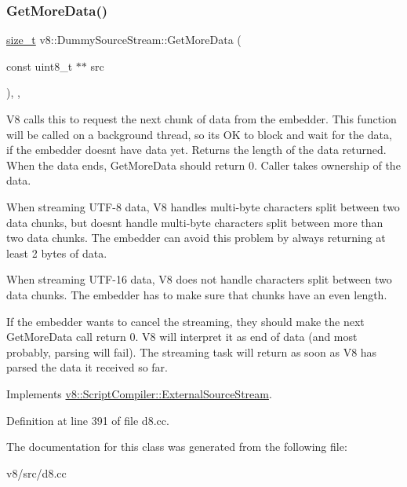 \subsubsection{\texorpdfstring{Get\+More\+Data()}{GetMoreData()}}
{\footnotesize\ttfamily \mbox{\hyperlink{classsize__t}{size\+\_\+t}} v8\+::\+Dummy\+Source\+Stream\+::\+Get\+More\+Data (\begin{DoxyParamCaption}\item[{const uint8\+\_\+t $\ast$$\ast$}]{src }\end{DoxyParamCaption})\hspace{0.3cm}{\ttfamily [inline]}, {\ttfamily [override]}, {\ttfamily [virtual]}}

V8 calls this to request the next chunk of data from the embedder. This function will be called on a background thread, so it\textquotesingle{}s OK to block and wait for the data, if the embedder doesn\textquotesingle{}t have data yet. Returns the length of the data returned. When the data ends, Get\+More\+Data should return 0. Caller takes ownership of the data.

When streaming U\+T\+F-\/8 data, V8 handles multi-\/byte characters split between two data chunks, but doesn\textquotesingle{}t handle multi-\/byte characters split between more than two data chunks. The embedder can avoid this problem by always returning at least 2 bytes of data.

When streaming U\+T\+F-\/16 data, V8 does not handle characters split between two data chunks. The embedder has to make sure that chunks have an even length.

If the embedder wants to cancel the streaming, they should make the next Get\+More\+Data call return 0. V8 will interpret it as end of data (and most probably, parsing will fail). The streaming task will return as soon as V8 has parsed the data it received so far. 

Implements \mbox{\hyperlink{classv8_1_1ScriptCompiler_1_1ExternalSourceStream_ac3a0221b5725f0b612a6342d8e83d899}{v8\+::\+Script\+Compiler\+::\+External\+Source\+Stream}}.



Definition at line 391 of file d8.\+cc.



The documentation for this class was generated from the following file\+:\begin{DoxyCompactItemize}
\item 
v8/src/d8.\+cc\end{DoxyCompactItemize}
